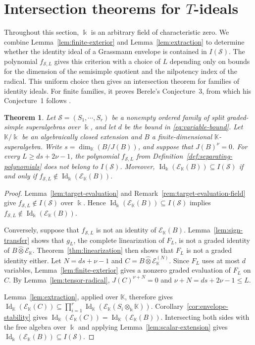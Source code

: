 \documentclass[11pt,reqno]{amsart}
\newcommand{\kk}{\Bbbk}
\newcommand{\KK}{\mathbb{K}}
\newcommand{\E}{\mathcal E}
\newcommand{\Id}{\operatorname{Id}}
\newtheorem{theorem}{Theorem}[section]
\theoremstyle{definition}
\theoremstyle{remark}
\numberwithin{equation}{section}
\begin{document}
\section{Intersection theorems for \texorpdfstring{$T$}{T}-ideals}\label{sec:finite-intersections}

Throughout this section, $\kk$ is an arbitrary field of
characteristic zero. We combine Lemma~\ref{lem:finite-exterior}
and Lemma~\ref{lem:extraction} to determine whether the identity ideal
of a Grassmann envelope is contained in $I(\mathcal S)$.
The polynomial $f_{\mathcal S,L}$ gives this criterion with a
choice of $L$ depending only on bounds for the dimension of the
semisimple quotient and the nilpotency index of the radical.
This uniform choice then gives an intersection theorem for
families of identity ideals. 
For finite families, it proves Berele's Conjecture~3,
from which his Conjecture~1 follows \cite{Berele2012}.


\begin{theorem}\label{thm:uniform-separation}
Let $\mathcal S=(S_1,\cdots,S_r)$ be a nonempty ordered family of split graded-simple superalgebras over $\kk$, and let $d$ be the bound in \eqref{eq:variable-bound}. Let $\KK/\kk$ be an algebraically closed extension and $B$ a finite-dimensional $\KK$-superalgebra. Write $s=\dim_{\KK}(B/J(B))$, and suppose that $J(B)^\nu=0$. For every $L\geq ds+2\nu-1$,
the polynomial $f_{\mathcal S,L}$ from
Definition~\ref{def:separating-polynomials} does not belong to $I(\mathcal S)$.
Moreover, $\Id_{\kk}(\E_{\KK}(B))\subseteq I(\mathcal S)$
if and only if $f_{\mathcal S,L}\notin\Id_{\kk}(\E_{\KK}(B))$.
\end{theorem}
\begin{proof}
Lemma~\ref{lem:target-evaluation} and
Remark~\ref{rem:target-evaluation-field} give
$f_{\mathcal S,L}\notin I(\mathcal S)$ over $\kk$.
Hence $\Id_{\kk}(\E_{\KK}(B))\subseteq I(\mathcal S)$ implies
$f_{\mathcal S,L}\notin\Id_{\kk}(\E_{\KK}(B))$.

Conversely, suppose that $f_{\mathcal S,L}$ is not an identity of $\E_{\KK}(B)$.
Lemma~\ref{lem:sign-transfer} shows that $g_L$, the complete
linearization of $F_L$, is not a graded identity of
$B\mathbin{\widehat{\otimes}}\E_{\KK}$.
Theorem~\ref{thm:linearization} then shows that $F_L$ is not a
graded identity either.
Let $N=ds+\nu-1$ and $C=B\mathbin{\widehat{\otimes}}\E_{\KK}^{(N)}$. Since $F_L$ uses at most $d$ variables, Lemma~\ref{lem:finite-exterior} gives a nonzero graded evaluation of $F_L$ on $C$. By Lemma~\ref{lem:tensor-radical}, $
J(C)^{\nu+N}=0$ and $
\nu+N=ds+2\nu-1\leq L$.

Lemma~\ref{lem:extraction}, applied over $\KK$, therefore gives
$
\Id_{\KK}(\E_{\KK}(C))
\subseteq\prod_{i=1}^r
\Id_{\KK}(\E_{\KK}(S_i\otimes_{\kk}\KK))$.
Corollary~\ref{cor:envelope-stability} gives $\Id_{\KK}(\E_{\KK}(C))=\Id_{\KK}(\E_{\KK}(B))$.
Intersecting both sides with the free algebra over $\kk$
and applying Lemma~\ref{lem:scalar-extension} gives
$\Id_{\kk}(\E_{\KK}(B))\subseteq I(\mathcal S)$.

\end{proof}
\end{document}
